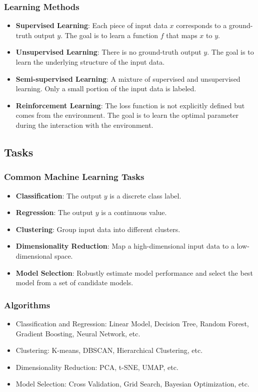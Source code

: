 \documentclass[beamer, en, version=2.0]{huangfusl-template}
\begin{document}
    \begin{frame}
        \frametitle{Learning Methods}

        \begin{itemize}
            \item \textbf{Supervised Learning}: Each piece of input data $x$ corresponds to a ground-truth output $y$. The goal is to learn a function $f$ that maps $x$ to $y$.
            \item \textbf{Unsupervised Learning}: There is no ground-truth output $y$. The goal is to learn the underlying structure of the input data.
            \item \textbf{Semi-supervised Learning}: A mixture of supervised and unsupervised learning. Only a small portion of the input data is labeled.
            \item \textbf{Reinforcement Learning}: The loss function is not explicitly defined but comes from the environment. The goal is to learn the optimal parameter during the interaction with the environment.
        \end{itemize}
    \end{frame}

    \subsection{Tasks}

    \begin{frame}
        \frametitle{Common Machine Learning Tasks}

        \begin{itemize}
            \item \textbf{Classification}: The output $y$ is a discrete class label.
            \item \textbf{Regression}: The output $y$ is a continuous value.
            \item \textbf{Clustering}: Group input data into different clusters.
            \item \textbf{Dimensionality Reduction}: Map a high-dimensional input data to a low-dimensional space.
            \item \textbf{Model Selection}: Robustly estimate model performance and select the best model from a set of candidate models.
        \end{itemize}
    \end{frame}

    \begin{frame}
        \frametitle{Algorithms}

        \begin{itemize}
            \item Classification and Regression: Linear Model, Decision Tree, Random Forest, Gradient Boosting, Neural Network, etc.
            \item Clustering: K-means, DBSCAN, Hierarchical Clustering, etc.
            \item Dimensionality Reduction: PCA, t-SNE, UMAP, etc.
            \item Model Selection: Cross Validation, Grid Search, Bayesian Optimization, etc.
        \end{itemize}
    \end{frame}
\end{document}
